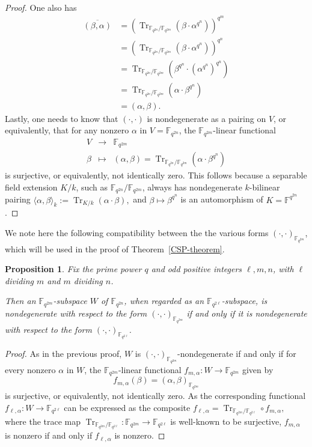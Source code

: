 \documentclass[10pt]{amsart}
\theoremstyle{plain}
\newtheorem{proposition}[theorem]{Proposition}
\theoremstyle{definition}
\theoremstyle{remark}
\numberwithin{equation}{section}
\newcommand\Tr{\operatorname{Tr}}
\newcommand\FF{\mathbb{F}}
\begin{document}
\begin{proof}
One also has
$$
\begin{array}{rll}
\overline{(\beta, \alpha)}
&= \left(
     \Tr_{\FF_{q^{2n}}/\FF_{q^{2m}}} \left(\beta \cdot \alpha^{q^n} \right)
   \right)^{q^m} \\
&=\left(
     \Tr_{\FF_{q^{2n}}/\FF_{q^{2m}}} \left(\beta \cdot \alpha^{q^n} \right)
   \right)^{q^n} \\
&=\Tr_{\FF_{q^{2n}}/\FF_{q^{2m}}} \left(\beta^{q^n} \cdot \left(\alpha^{q^n}\right)^{q^n} \right)\\
&=\Tr_{\FF_{q^{2n}}/\FF_{q^{2m}}} \left(\alpha \cdot \beta^{q^n} \right)\\
&=(\alpha,\beta).
\end{array}
$$
Lastly, one needs to know that $(\cdot,\cdot)$ is nondegenerate
as a pairing on $V$, or equivalently, that for any nonzero
$\alpha$ in $V=\FF_{q^{2n}}$, the $\FF_{q^{2m}}$-linear functional
$$
\begin{array}{rcl}
V &\longrightarrow &\FF_{q^{2m}} \\
\beta &\longmapsto & 
   (\alpha,\beta) =  
    \Tr_{\FF_{q^{2n}}/\FF_{q^{2m}}} \left(\alpha \cdot \beta^{q^n} \right)
\end{array}
$$
is surjective, or equivalently, not identically zero.  
This follows because a separable field extension $K/k$, 
such as $\FF_{q^{2n}}/\FF_{q^{2m}}$, always has nondegenerate
$k$-bilinear pairing 
$
\langle \alpha,\beta \rangle_k := 
\Tr_{K/k}(\alpha \cdot \beta),
$
and $\beta \mapsto \beta^{q^n}$ is
an automorphism of $K=\FF^{q^{2n}}$.
\end{proof}

We note here the following compatibility between the
the various forms $(\cdot, \cdot)_{\FF_{q^{2m}}}$, which will be
used in the proof of Theorem~\ref{CSP-theorem}.

\begin{proposition}
\label{nondegeneracy-consistency}
Fix the prime power $q$ and odd positive integers $\ell,m,n$,
with $\ell$ dividing $m$ and $m$ dividing $n$.

Then an $\FF_{q^{2m}}$-subspace $W$ of $\FF_{q^{2n}}$, 
when regarded as an $\FF_{q^{2\ell}}$-subspace,
is nondegenerate with respect to the form $(\cdot, \cdot)_{\FF_{q^{2m}}}$
if and only if it is nondegenerate with respect to the form 
$(\cdot, \cdot)_{\FF_{q^{2\ell}}}$.
\end{proposition}
\begin{proof}
As in the previous proof, $W$ is 
$(\cdot, \cdot)_{\FF_{q^{2m}}}$-nondegenerate 
if and only if for every nonzero $\alpha$ in $W$, the
$\FF_{q^{2m}}$-linear functional 
$f_{m,\alpha}:W \rightarrow \FF_{q^{2m}}$
given by 
$$
f_{m,\alpha}(\beta)=(\alpha, \beta)_{\FF_{q^{2m}}}
$$
is surjective, or equivalently, not identically zero.
As the corresponding functional 
$f_{\ell,\alpha}:W \rightarrow \FF_{q^{2\ell}}$
can be expressed as the composite
$
f_{\ell,\alpha} = \Tr_{\FF_{q^{2m}}/\FF_{q^{2\ell}}} \circ f_{m,\alpha},
$
where the trace map 
$\Tr_{\FF_{q^{2m}}/\FF_{q^{2\ell}}}: \FF_{q^{2m}} \longrightarrow \FF_{q^{2\ell}}$
is well-known to be surjective,
$f_{m,\alpha}$ is nonzero if and only if $f_{\ell,\alpha}$ is nonzero.
\end{proof}
\end{document}
